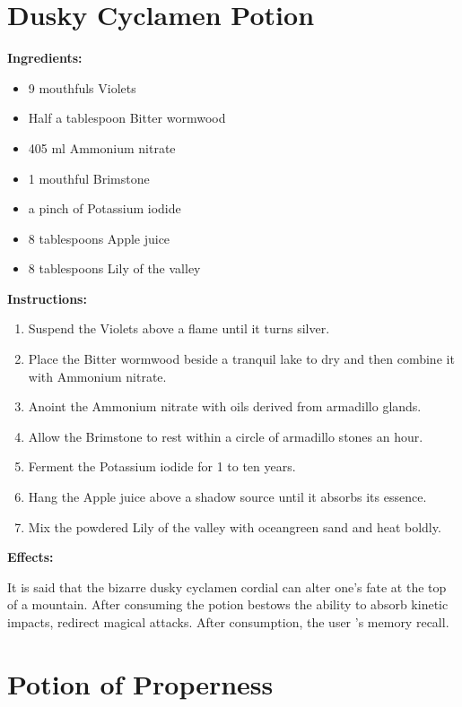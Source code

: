 \documentclass{article}
\begin{document}
\newpage
\section*{Dusky Cyclamen Potion}

\textbf{Ingredients:}

\begin{itemize}
  \item 9 mouthfuls Violets
  \item Half a tablespoon Bitter wormwood
  \item 405 ml Ammonium nitrate
  \item 1 mouthful Brimstone
  \item a pinch of Potassium iodide
  \item 8 tablespoons Apple juice
  \item 8 tablespoons Lily of the valley
\end{itemize}

\textbf{Instructions:}

\begin{enumerate}
  \item Suspend the Violets above a flame until it turns silver.
  \item Place the Bitter wormwood beside a tranquil lake to dry and then combine it with Ammonium nitrate.
  \item Anoint the Ammonium nitrate with oils derived from armadillo glands.
  \item Allow the Brimstone to rest within a circle of armadillo stones an hour.
  \item Ferment the Potassium iodide for 1 to ten years.
  \item Hang the Apple juice above a shadow source until it absorbs its essence.
  \item Mix the powdered Lily of the valley with oceangreen sand and heat boldly.
\end{enumerate}

\textbf{Effects:}

It is said that the bizarre dusky cyclamen cordial can alter one's fate at the top of a mountain. After consuming the potion bestows the ability to absorb kinetic impacts, redirect magical attacks. After consumption, the user 's memory recall.

\newpage
\section*{Potion of Properness}
\end{document}
